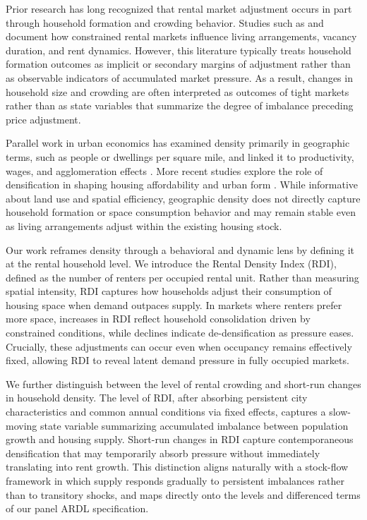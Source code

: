 \documentclass[pdflatex,sn-apa]{sn-jnl}%
\theoremstyle{thmstyleone}%
\theoremstyle{thmstyletwo}%
\theoremstyle{thmstylethree}%
\begin{document}
Prior research has long recognized that rental market adjustment occurs in part through
household formation and crowding behavior. Studies such as \cite{gabriel2001rental}
and \cite{sirmans1991determinants} document how constrained rental markets influence
living arrangements, vacancy duration, and rent dynamics. However, this literature
typically treats household formation outcomes as implicit or secondary margins of
adjustment rather than as observable indicators of accumulated market pressure. As a
result, changes in household size and crowding are often interpreted as outcomes of
tight markets rather than as state variables that summarize the degree of imbalance
preceding price adjustment.

Parallel work in urban economics has examined density primarily in geographic terms,
such as people or dwellings per square mile, and linked it to productivity, wages, and
agglomeration effects \cite{glaeser2001cities, duranton2004micro}. More recent studies
explore the role of densification in shaping housing affordability and urban form
\cite{ahlfeldt2019economic, albouy2015driving}. While informative about land use and
spatial efficiency, geographic density does not directly capture household formation or
space consumption behavior and may remain stable even as living arrangements adjust
within the existing housing stock.

Our work reframes density through a behavioral and dynamic lens by defining it at the
rental household level. We introduce the Rental Density Index (RDI), defined as the
number of renters per occupied rental unit. Rather than measuring spatial intensity, RDI
captures how households adjust their consumption of housing space when demand
outpaces supply. In markets where renters prefer more space, increases in RDI reflect
household consolidation driven by constrained conditions, while declines indicate
de-densification as pressure eases. Crucially, these adjustments can occur even when
occupancy remains effectively fixed, allowing RDI to reveal latent demand pressure in
fully occupied markets.

We further distinguish between the level of rental crowding and short-run changes in
household density. The level of RDI, after absorbing persistent city characteristics
and common annual conditions via fixed effects, captures a slow-moving state 
variable summarizing accumulated imbalance between population growth and housing 
supply. Short-run changes in RDI capture contemporaneous densification that may 
temporarily absorb pressure without immediately translating into rent growth. This 
distinction aligns naturally with a stock-flow framework in which supply responds 
gradually to persistent imbalances rather than to transitory shocks, and maps directly 
onto the levels and differenced terms of our panel ARDL specification.
\end{document}
